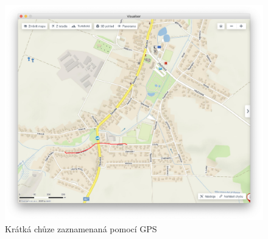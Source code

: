 \documentclass[czech, bachelor]{diploma}
\begin{document}
\begin{figure}
    \centering
    \includegraphics[width=1\textwidth]{Figures/olsinapesky.png}
    \caption{Krátká chůze zaznamenaná pomocí GPS}
    \label{fig:olsinapesky-fullsize}
\end{figure}

% 
% 
\end{document}
